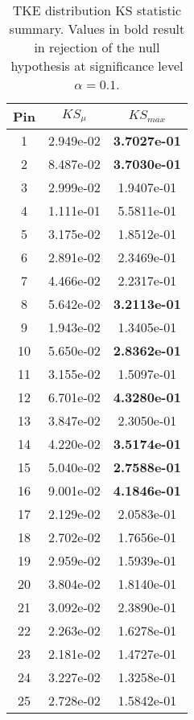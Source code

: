 \begin{table}[h]
    \begin{center}
    \caption[KS statistic TKE summary.]{TKE distribution KS statistic summary. Values in bold result in rejection of the null hypothesis at significance level $\alpha=0.1$.}
    \begin{tabular}[h]{|c|c|c|}
        \hline
        Pin & $KS_\mu$ & $KS_{max}$ \\
\hline
1 &  2.949e-02 &  \textbf{3.7027e-01} \\
2 &  8.487e-02 &  \textbf{3.7030e-01} \\
3 &  2.999e-02 &  1.9407e-01 \\
4 &  1.111e-01 &  5.5811e-01 \\
5 &  3.175e-02 &  1.8512e-01 \\
6 &  2.891e-02 &  2.3469e-01 \\
7 &  4.466e-02 &  2.2317e-01 \\
8 &  5.642e-02 &  \textbf{3.2113e-01} \\
9 &  1.943e-02 &  1.3405e-01 \\
10 & 5.650e-02 & \textbf{2.8362e-01} \\
11 & 3.155e-02 & 1.5097e-01 \\
12 & 6.701e-02 & \textbf{4.3280e-01} \\
13 & 3.847e-02 & 2.3050e-01 \\
14 & 4.220e-02 & \textbf{3.5174e-01} \\
15 & 5.040e-02 & \textbf{2.7588e-01} \\
16 & 9.001e-02 & \textbf{4.1846e-01} \\
17 & 2.129e-02 & 2.0583e-01 \\
18 & 2.702e-02 & 1.7656e-01 \\
19 & 2.959e-02 & 1.5939e-01 \\
20 & 3.804e-02 & 1.8140e-01 \\
21 & 3.092e-02 & 2.3890e-01 \\
22 & 2.263e-02 & 1.6278e-01 \\
23 & 2.181e-02 & 1.4727e-01 \\
24 & 3.227e-02 & 1.3258e-01 \\
25 & 2.728e-02 & 1.5842e-01 \\
\hline
\end{tabular}
\label{tab:ks_tke}
\end{center}
\end{table}


